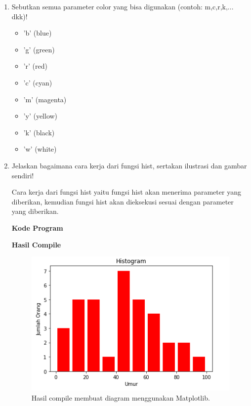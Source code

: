 \begin{enumerate}
		\item Sebutkan semua parameter color yang bisa digunakan (contoh:  m,c,r,k,...  dkk)!
		
			\begin{itemize}
				\item 'b' (blue)
				\item 'g' (green)
				\item 'r' (red)
				\item 'c' (cyan)
				\item 'm' (magenta)
				\item 'y' (yellow)
				\item 'k' (black)
				\item 'w' (white)
			\end{itemize}

		\item Jelaskan bagaimana cara kerja dari fungsi hist, sertakan ilustrasi dan gambar sendiri!

			\hfill \break
			Cara kerja dari fungsi hist yaitu fungsi hist akan menerima parameter yang diberikan, kemudian fungsi hist akan dieksekusi sesuai dengan parameter yang diberikan.

			\hfill \break
			\textbf{Kode Program}

			

			\hfill \break
			\textbf{Hasil Compile}

			\begin{figure}[H]
				\includegraphics[width=12cm]{figures/chapter6/1174057/7histogram.png}
				\centering
				\caption{Hasil compile membuat diagram menggunakan Matplotlib.}
			\end{figure}
			

\end{enumerate}
